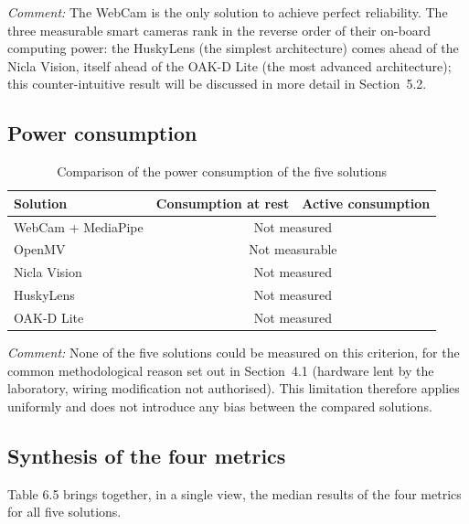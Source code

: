 \documentclass[12pt,a4paper]{report}
\begin{document}
	\noindent\textit{Comment:} The WebCam is the only solution to achieve perfect reliability. The three measurable smart cameras rank in the reverse order of their on-board computing power: the HuskyLens (the simplest architecture) comes ahead of the Nicla Vision, itself ahead of the OAK-D Lite (the most advanced architecture); this counter-intuitive result will be discussed in more detail in Section~5.2.
	
	\subsection*{Power consumption}
	
	\begin{table}[H]
		\centering
		\small
		\renewcommand{\arraystretch}{1.2}
		\begin{tabularx}{\textwidth}{|l|X|X|}
			\hline
			\textbf{Solution} & \textbf{Consumption at rest} & \textbf{Active consumption} \\
			\hline
			WebCam + MediaPipe & \multicolumn{2}{c|}{Not measured} \\
			\hline
			OpenMV & \multicolumn{2}{c|}{Not measurable} \\
			\hline
			Nicla Vision & \multicolumn{2}{c|}{Not measured} \\
			\hline
			HuskyLens & \multicolumn{2}{c|}{Not measured} \\
			\hline
			OAK-D Lite & \multicolumn{2}{c|}{Not measured} \\
			\hline
		\end{tabularx}
		\caption{Comparison of the power consumption of the five solutions}
		\label{tab:comparatif-consommation}
	\end{table}
	
	\noindent\textit{Comment:} None of the five solutions could be measured on this criterion, for the common methodological reason set out in Section~4.1 (hardware lent by the laboratory, wiring modification not authorised). This limitation therefore applies uniformly and does not introduce any bias between the compared solutions.
	
	\subsection*{Synthesis of the four metrics}
	
	Table 6.5 brings together, in a single view, the median results of the four metrics for all five solutions.
	
\end{document}
